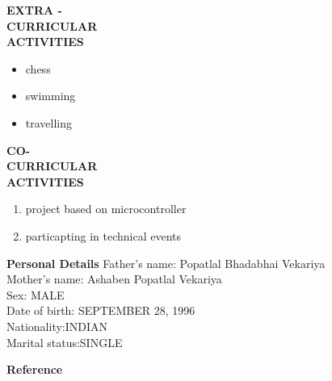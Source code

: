 \documentclass{article}
\begin{document}
	\begin{flushleft} 
		
		
		
		\vspace{0.4in}
		\textbf{EXTRA - \\CURRICULAR \\ACTIVITIES }
		\begin{itemize}
			\vspace{-0.65in}
			\addtolength{\itemindent}{1.359in}
			\item  chess
			\item swimming
			\item travelling
			
			
		\end{itemize}
	\end{flushleft}

 \begin{flushleft} 
 	\vspace{0.4in}
 	\textbf{CO- \\CURRICULAR \\ACTIVITIES }
 	\begin{enumerate}
 		\vspace{-0.65in}
 		\addtolength{\itemindent}{1.359in}
 		\item  project based on microcontroller
 		\item  particapting in  technical events
 		
 	\end{enumerate}
 \end{flushleft}
 
 
 \begin{flushleft}
 	\vspace{0.4in}
 	\textbf{Personal Details} \hspace{0.36in}Father's name: \hspace{0.13in} Popatlal Bhadabhai Vekariya  \\
 	\hspace{1.55in}Mother's name: \hspace{0.08in} Ashaben Popatlal Vekariya \\
 	\hspace{1.55in}Sex:\hspace{0.85in} MALE\\
 	\hspace{1.55in}Date of birth:\hspace{0.255in} SEPTEMBER 28, 1996	\\
 	\hspace{1.55in}Nationality:\hspace{0.45in}INDIAN\\
 	\hspace{1.55in}Marital status:\hspace{0.28in}SINGLE
 	
 \end{flushleft}     
 
 
 \begin{flushleft}
 	\vspace{0.4in}
 	\textbf{Reference} \hspace{0.75in} 
 \end{flushleft}
 
\end{document}
